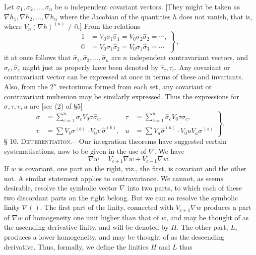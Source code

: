 \documentclass[11pt]{article}
\begin{document}
\indent Let $\sigma_1,\sigma_2,\ldots,\sigma_n$ be $n$ independent covariant vectors. [They might be taken as $\nabla h_1,\nabla h_2,\ldots,\nabla h_n$ where the Jacobian of the quantities $h$ does not vanish, that is, where $V_n(\nabla h)^{(n)}\ne0$.] From the relations
\begin{equation}\left.\begin{aligned}1&=V_0\sigma_1\hat{\sigma}_1=V_0\sigma_2\hat{\sigma}_2=\cdots,\\0&=V_0\sigma_1\hat{\sigma}_2=V_0\sigma_1\hat{\sigma}_3=\cdots\end{aligned}\right\},\tag{16}\end{equation}
it at once follows that $\hat{\sigma}_1,\hat{\sigma}_2,\ldots,\hat{\sigma}_n$ are $n$ independent contravariant vectors, and $\sigma_c,\hat{\sigma}_c$ might just as properly have been denoted by $\hat{\tau}_c,\tau_c$. Any covariant or contravariant vector can be expressed at once in terms of these and invariants. Also, from the $2^n$ vectoriums formed from each set,
any covariant or contravariant multenion may be similarly expressed. Thus the expressions for $\sigma,\tau,v,u$ are [see (2) of §5]
\begin{equation}\left.\begin{aligned}\sigma&=\sum_{c=1}^n\sigma_cV_0\sigma\hat{\sigma}_c,&\tau&=\sum_{c=1}^n\hat{\sigma}_cV_0\tau\sigma_c,\\v&=\sum V_b\sigma^{(b)}\cdot V_0v\,\hat{\sigma}^{(b)},&u&=\sum V_a\hat{\sigma}^{(a)}\cdot V_0uV_a\sigma^{(a)}\end{aligned}\right\}.\tag{17}\end{equation}
\noindent\textsc{§ 10. Differentiation.}---Our integration theorems have suggested certain systematisations, now to be given in the use of $\nabla$. We have
\[\nabla w=V_{c+1}\nabla w+V_{c-1}\nabla w.\]
If $w$ is covariant, one part on the right, viz., the first, is covariant and the other not. A similar statement applies to contravariance. We cannot, as seems desirable, resolve the symbolic vector $\nabla$ into two parts, to which each of these two discordant parts on the right belong. But we can so resolve the symbolic linity $\nabla()$. The first part of the linity, connected with $V_{c+1}\nabla w$ produces a part of $\nabla w$ of homogeneity one unit higher than that of $w$, and may be thought of as the ascending derivative linity, and will be denoted by $H$. The other part, $L$, produces a lower homogeneity, and may be thought of as the descending derivative. Thus, formally, we define the linities $H$ and $L$ thus
\end{document}
